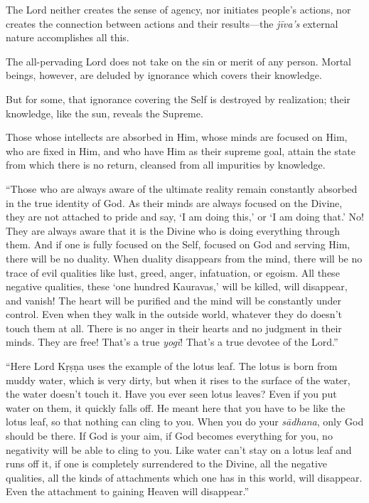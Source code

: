 {The Lord neither creates the sense of agency, nor initiates people’s actions, nor creates the connection between actions and their results---the \textit{jīva's} external nature accomplishes all this.}

{The all-pervading Lord does not take on the sin or merit of any person.
Mortal beings, however, are deluded by ignorance which covers their knowledge.}

{But for some, that ignorance covering the Self is destroyed by realization; their knowledge, like the sun, reveals the Supreme.}

{Those whose intellects are absorbed in Him, whose minds are focused on Him, who are fixed in Him, and who have Him as their supreme goal, attain the state from which there is no return, cleansed from all impurities by knowledge.}



\enquote{Those who are always aware of the ultimate reality remain constantly absorbed in the true identity of God. As their minds are always focused on the Divine, they are not attached to pride and say, \enquote{I am doing this,} or \enquote{I am doing that.} No! They are always aware that it is the Divine who is doing everything through them. And if one is fully focused on the Self, focused on God and serving Him, there will be no duality. When duality disappears from the mind, there will be no trace of evil qualities like lust, greed, anger, infatuation, or egoism. All these negative qualities, these \enquote{one hundred Kauravas,} will be killed, will disappear, and vanish! The heart will be purified and the mind will be constantly under control. Even when they walk in the outside world, whatever they do doesn’t touch them at all. There is no anger in their hearts and no judgment in their minds. They are free! That’s a true \textit{yogī}! That’s a true devotee of the Lord.}

\enquote{Here Lord Kṛṣṇa uses the example of the lotus leaf. The lotus is born from muddy water, which is very dirty, but when it rises to the surface of the water, the water doesn’t touch it. Have you ever seen lotus leaves? Even if you put water on them, it quickly falls off. He meant here that you have to be like the lotus leaf, so that nothing can cling to you. When you do your \textit{sādhana}, only God should be there. If God is your aim, if God becomes everything for you, no negativity will be able to cling to you. Like water can’t stay on a lotus leaf and runs off it, if one is completely surrendered to the Divine, all the negative qualities, all the kinds of attachments which one has in this world, will disappear. Even the attachment to gaining Heaven will disappear.}

